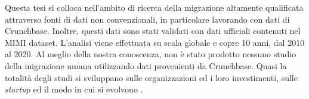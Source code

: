 Questa tesi si colloca nell'ambito di ricerca della migrazione altamente qualificata attraverso fonti di dati non convenzionali, in particolare lavorando con dati di Crunchbase. Inoltre, questi dati sono stati validati con dati ufficiali contenuti nel MIMI dataset. L'analisi viene effettuata su scala globale e copre 10 anni, dal 2010 al 2020. Al meglio della nostra conoscenza, non è stato prodotto nessuno studio della migrazione umana utilizzando dati provenienti da Crunchbase. Quasi la totalità degli studi si sviluppano sulle organizzazioni ed i loro investimenti, sulle \textit{startup} ed il modo in cui si evolvono \cite{6c418d60-en}.



